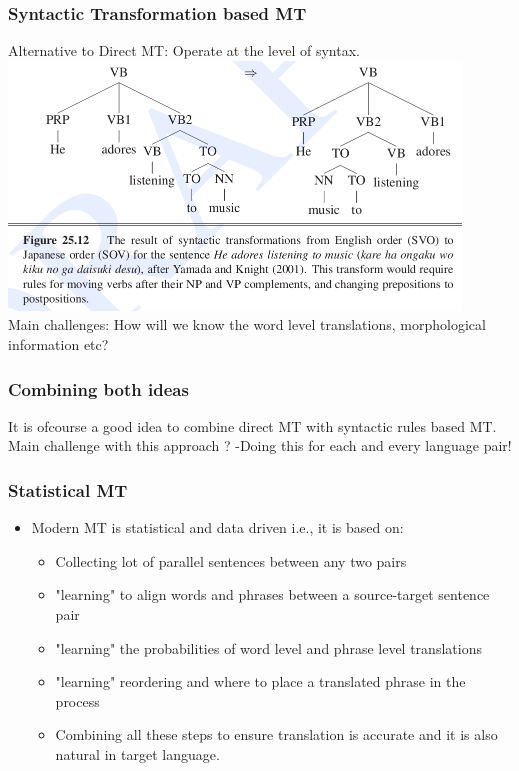 \documentclass{beamer}
\begin{document}
\begin{frame}
\frametitle{Syntactic Transformation based MT}
Alternative to Direct MT: Operate at the level of syntax.
\includegraphics[width=0.9\textwidth]{transformMT.png}
\\ Main challenges: How will we know the word level translations, morphological information etc?
\end{frame}

\begin{frame}
\frametitle{Combining both ideas}
It is ofcourse a good idea to combine direct MT with syntactic rules based MT. 
\\ Main challenge with this approach ? \pause -Doing this for each and every language pair!
\end{frame}

\begin{frame}
\frametitle{Statistical MT}
\begin{itemize}
\item Modern MT is statistical and data driven i.e., it is based on:
\begin{itemize}
\item Collecting lot of parallel sentences between any two pairs
\item "learning" to align words and phrases between a source-target sentence pair
\item "learning" the probabilities of word level and phrase level translations
\item "learning" reordering and where to place a translated phrase in the process
\item  Combining all these steps to ensure translation is accurate and it is also natural in target language.
\end{itemize}
\end{itemize}
\end{frame}
\end{document}
